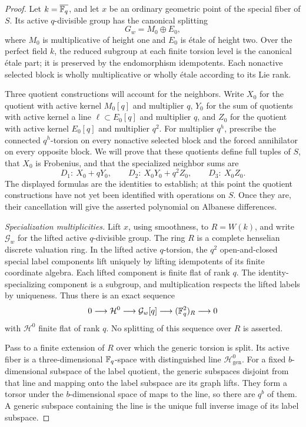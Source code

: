 \begin{proof}
Let \(k=\overline{\mathbb{F}_q}\), and let \(x\) be an ordinary geometric
point of the special fiber of \(S\).  Its active \(q\)-divisible
group has the canonical splitting
\[
G_w=M_0\oplus E_0,
\]
where \(M_0\) is multiplicative of height one and \(E_0\) is
étale of height two.  Over the perfect field \(k\), the reduced
subgroup at each finite torsion level is the canonical étale
part; it is preserved by the endomorphism idempotents.  Each
nonactive selected block is wholly multiplicative or wholly
étale according to its Lie rank.

Three quotient constructions will account for the neighbors.
Write \(X_0\) for the quotient with active kernel \(M_0[q]\)
and multiplier \(q\), \(Y_0\) for the sum of quotients with
active kernel a line \(\ell\subset E_0[q]\) and multiplier
\(q\), and \(Z_0\) for the quotient with active kernel
\(E_0[q]\) and multiplier \(q^2\).  For multiplier \(q^h\),
prescribe the connected \(q^h\)-torsion on every nonactive
selected block and the forced annihilator on every opposite block.
We will prove that these quotients define full tuples of \(S\),
that \(X_0\) is Frobenius, and that the specialized neighbor sums are
\[
D_1:\ X_0+qY_0,\qquad
D_2:\ X_0Y_0+q^2Z_0,\qquad
D_3:\ X_0Z_0.
\]
The displayed formulas are the identities to establish; at this
point the quotient constructions have not yet been identified with
operations on \(S\).  Once they are, their cancellation will give
the asserted polynomial on Albanese differences.

\smallskip
\noindent\emph{Specialization multiplicities.}
Lift \(x\), using smoothness, to \(R=W(k)\), and write
\(\mathcal G_w\) for the lifted active \(q\)-divisible group.
The ring \(R\) is a complete henselian discrete valuation ring.
In the lifted active
\(q\)-torsion, the \(q^2\) open-and-closed special label
components lift uniquely by lifting idempotents of its finite
coordinate algebra.  Each lifted component is finite flat of
rank \(q\).  The identity-specializing component is a subgroup,
and multiplication respects the lifted labels by uniqueness.
Thus there is an exact sequence
\[
0\longrightarrow\mathcal H^0
\longrightarrow\mathcal G_w[q]
\longrightarrow(\mathbb{F}_q^2)_R\longrightarrow0
\]
with \(\mathcal H^0\) finite flat of rank \(q\).  No splitting
of this sequence over \(R\) is asserted.

Pass to a finite extension of \(R\) over which the generic torsion
is split.  Its active fiber is a three-dimensional \(\mathbb{F}_q\)-space
with distinguished line \(\mathcal H^0_{\mathrm{gen}}\).
For a fixed \(b\)-dimensional subspace of the label quotient,
the generic subspaces disjoint from that line and mapping onto
the label subspace are its graph lifts.  They form a torsor
under the \(b\)-dimensional space of maps to the line, so there
are \(q^b\) of them.  A generic subspace containing the line is
the unique full inverse image of its label subspace.


\end{proof}
